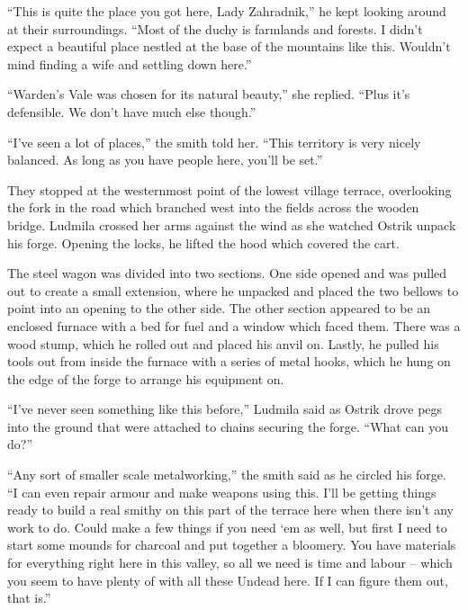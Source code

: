 

“This is quite the place you got here, Lady Zahradnik,” he kept looking around at their surroundings. “Most of the duchy is farmlands and forests. I didn’t expect a beautiful place nestled at the base of the mountains like this. Wouldn’t mind finding a wife and settling down here.”

 

“Warden’s Vale was chosen for its natural beauty,” she replied. “Plus it’s defensible. We don’t have much else though.”

 

“I’ve seen a lot of places,” the smith told her. “This territory is very nicely balanced. As long as you have people here, you’ll be set.”

 

They stopped at the westernmost point of the lowest village terrace, overlooking the fork in the road which branched west into the fields across the wooden bridge. Ludmila crossed her arms against the wind as she watched Ostrik unpack his forge. Opening the locks, he lifted the hood which covered the cart.

 

The steel wagon was divided into two sections. One side opened and was pulled out to create a small extension, where he unpacked and placed the two bellows to point into an opening to the other side. The other section appeared to be an enclosed furnace with a bed for fuel and a window which faced them. There was a wood stump, which he rolled out and placed his anvil on. Lastly, he pulled his tools out from inside the furnace with a series of metal hooks, which he hung on the edge of the forge to arrange his equipment on.

 

“I’ve never seen something like this before,” Ludmila said as Ostrik drove pegs into the ground that were attached to chains securing the forge. “What can you do?”

 

“Any sort of smaller scale metalworking,” the smith said as he circled his forge. “I can even repair armour and make weapons using this. I’ll be getting things ready to build a real smithy on this part of the terrace here when there isn’t any work to do. Could make a few things if you need ‘em as well, but first I need to start some mounds for charcoal and put together a bloomery. You have materials for everything right here in this valley, so all we need is time and labour – which you seem to have plenty of with all these Undead here. If I can figure them out, that is.”

